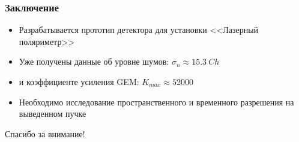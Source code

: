 \documentclass[14pt]{beamer}
\begin{document}
\begin{frame}[t]
\frametitle{Заключение}
\begin{itemize}
	\item Разрабатывается прототип детектора для установки <<Лазерный поляриметр>>
	\item Уже получены данные об уровне шумов: $\sigma_{n} \approx15.3~Ch$
	\item и коэффициенте усиления GEM: $K_{max} \approx 52000$
	\item \color{calmRed} {Необходимо исследование пространственного и временного разрешения на выведенном пучке}
\end{itemize}
\end{frame}
\begin{frame}
\begin{center}
Спасибо за внимание!
\end{center}
\end{frame}


\end{document}

